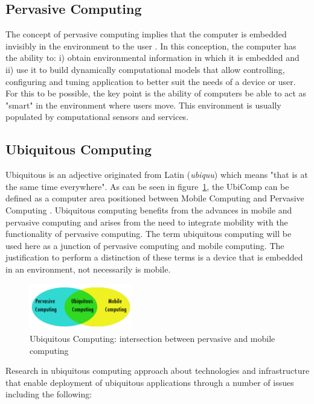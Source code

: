 \documentclass{acm_proc_article-sp}
\begin{document}
\subsection{Pervasive Computing}
The concept of pervasive computing implies that the computer is embedded invisibly in the environment to the user \cite{krumm2009}. In this conception, the computer has the ability to: i) obtain environmental information in which it is embedded and ii) use it to build dynamically computational models that allow controlling, configuring and tuning application to better suit the needs of a device or user. For this to be possible, the key point is the ability of computers be able to act as "smart" in the environment where users move. This environment is usually populated by computational sensors and services.

\subsection{Ubiquitous Computing}
Ubiquitous is an adjective originated from Latin (\textit{ubiquu}) which means "that is at the same time everywhere". As can be seen in figure~\ref{fig:ubiq}, the UbiComp can be defined as a computer area positioned between Mobile Computing and Pervasive Computing \cite{de2003computaccao,krumm2009}. Ubiquitous computing benefits from the advances in mobile and pervasive computing and arises from the need to integrate mobility with the functionality of pervasive computing. The term ubiquitous computing will be used here as a junction of pervasive computing and mobile computing. The justification to perform a distinction of these terms is a device that is embedded in an environment, not necessarily is mobile.
\begin{figure}[h]
\centering
    \includegraphics[width=0.4\textwidth,natwidth=610,natheight=642]{pictures/ubiq.png}
    \caption{Ubiquitous Computing: intersection between pervasive and mobile computing}
    \label{fig:ubiq}
\end{figure}
\newline
\newline
Research in ubiquitous computing approach about technologies and infrastructure that enable deployment of ubiquitous applications through a number of issues including the following:
\end{document}
